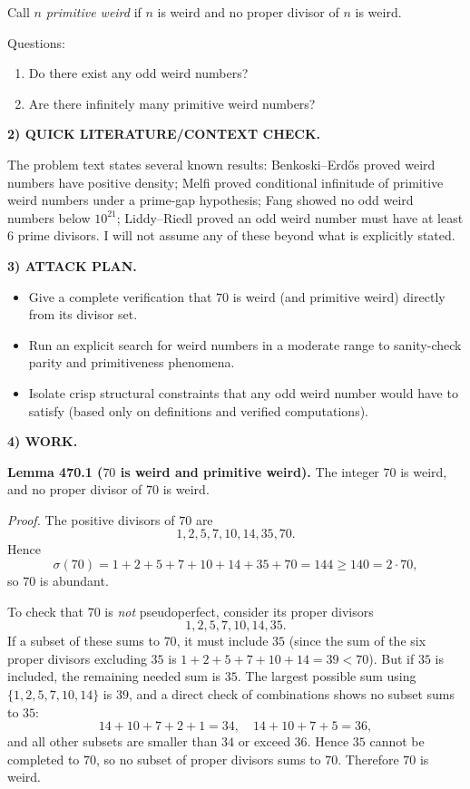 Call $n$ \emph{primitive weird} if $n$ is weird and no proper divisor of $n$ is weird.

Questions:
\begin{enumerate}
\item Do there exist any odd weird numbers?
\item Are there infinitely many primitive weird numbers?
\end{enumerate}

\medskip
\noindent\textbf{2) QUICK LITERATURE/CONTEXT CHECK.}

The problem text states several known results: Benkoski--Erd\H{o}s \cite{BeEr74} proved weird numbers have positive density; Melfi \cite{Me15} proved conditional infinitude of primitive weird numbers under a prime-gap hypothesis; Fang \cite{Fa22} showed no odd weird numbers below $10^{21}$; Liddy--Riedl \cite{LiRi18} proved an odd weird number must have at least 6 prime divisors. I will not assume any of these beyond what is explicitly stated.

\medskip
\noindent\textbf{3) ATTACK PLAN.}

\begin{itemize}
\item Give a complete verification that $70$ is weird (and primitive weird) directly from its divisor set.
\item Run an explicit search for weird numbers in a moderate range to sanity-check parity and primitiveness phenomena.
\item Isolate crisp structural constraints that any odd weird number would have to satisfy (based only on definitions and verified computations).
\end{itemize}

\medskip
\noindent\textbf{4) WORK.}

\noindent\textbf{Lemma 470.1 ($70$ is weird and primitive weird).}
The integer $70$ is weird, and no proper divisor of $70$ is weird.

\textit{Proof.}
The positive divisors of $70$ are
\[
1,2,5,7,10,14,35,70.
\]
Hence
\[
\sigma(70)=1+2+5+7+10+14+35+70=144\ge 140=2\cdot 70,
\]
so $70$ is abundant.

To check that $70$ is \emph{not} pseudoperfect, consider its proper divisors
\[
1,2,5,7,10,14,35.
\]
If a subset of these sums to $70$, it must include $35$ (since the sum of the six proper divisors excluding $35$ is $1+2+5+7+10+14=39<70$). But if $35$ is included, the remaining needed sum is $35$. The largest possible sum using $\{1,2,5,7,10,14\}$ is $39$, and a direct check of combinations shows no subset sums to $35$:
\[
14+10+7+2+1=34,\quad 14+10+7+5=36,
\]
and all other subsets are smaller than $34$ or exceed $36$. Hence $35$ cannot be completed to $70$, so no subset of proper divisors sums to $70$. Therefore $70$ is weird.

